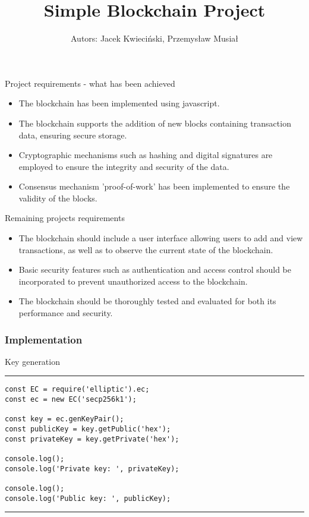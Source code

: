 \documentclass[14pt, aspectratio=169]{beamer}
\title{Simple Blockchain Project}
\date{}
\author{Autors: Jacek Kwieciński, Przemysław Musiał}
\begin{document}
\maketitle

\begin{frame}{Project requirements - what has been achieved}
\begin{itemize}
    \item The blockchain has been implemented using javascript.
    \item The blockchain supports the addition of new blocks containing transaction data, ensuring secure storage.
    \item Cryptographic mechanisms such as hashing and digital signatures are employed to ensure the integrity and security of the data.
    \item Consensus mechanism 'proof-of-work' has been implemented to ensure the validity of the blocks.
\end{itemize}
    
\end{frame}
\begin{frame}{Remaining projects requirements}
\begin{itemize}
    \item The blockchain should include a user interface allowing users to add and view transactions, as well as to observe the current state of the blockchain.
    \item Basic security features such as authentication and access control should be incorporated to prevent unauthorized access to the blockchain.
    \item The blockchain should be thoroughly tested and evaluated for both its performance and security.
\end{itemize}
\end{frame}

\begin{frame}[fragile]
\frametitle{Implementation}
Key generation
\scriptsize
\rule{\textwidth}{1pt}
\begin{verbatim}
const EC = require('elliptic').ec;
const ec = new EC('secp256k1');

const key = ec.genKeyPair();
const publicKey = key.getPublic('hex');
const privateKey = key.getPrivate('hex');

console.log();
console.log('Private key: ', privateKey);

console.log();
console.log('Public key: ', publicKey);
\end{verbatim}
\rule{\textwidth}{1pt}
\end{frame}
\end{document}
